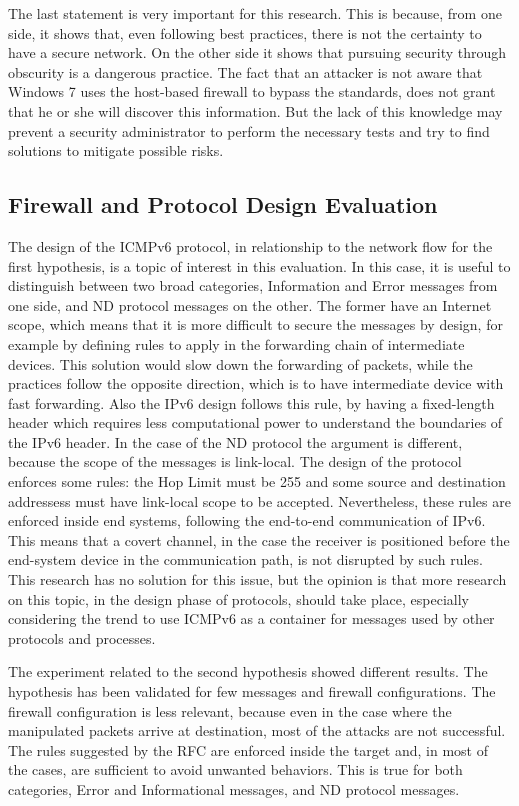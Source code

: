 \documentclass[12pt]{article}
\begin{document}
The last statement is very important for this research. This is because, from one side, it shows that, even following best practices, there is not the certainty to have a secure network. On the other side it shows that pursuing security through obscurity is a dangerous practice. The fact that an attacker is not aware that Windows 7 uses the host-based firewall to bypass the standards, does not grant that he or she will discover this information. But the lack of this knowledge may prevent a security administrator to perform the necessary tests and try to find solutions to mitigate possible risks.

\subsection{Firewall and Protocol Design Evaluation}
\label{sub:firewallEvaluation}

The design of the ICMPv6 protocol, in relationship to the network flow for the first hypothesis, is a topic of interest in this evaluation. In this case, it is useful to distinguish between two broad categories, Information and Error messages from one side, and ND protocol messages on the other. The former have an Internet scope, which means that it is more difficult to secure the messages by design, for example by defining rules to apply in the forwarding chain of intermediate devices. This solution would slow down the forwarding of packets, while the practices follow the opposite direction, which is to have intermediate device with fast forwarding. Also the IPv6 design follows this rule, by having a fixed-length header which requires less computational power to understand the boundaries of the IPv6 header. In the case of the ND protocol the argument is different, because the scope of the messages is link-local. The design of the protocol enforces some rules: the Hop Limit must be 255 and some source and destination addressess must have link-local scope to be accepted. Nevertheless, these rules are enforced inside end systems, following the end-to-end communication of IPv6. This means that a covert channel, in the case the receiver is positioned before the end-system device in the communication path, is not disrupted by such rules. This research has no solution for this issue, but the opinion is that more research on this topic, in the design phase of protocols, should take place, especially considering the trend to use ICMPv6 as a container for messages used by other protocols and processes.

The experiment related to the second hypothesis showed different results. The hypothesis has been validated for few messages and firewall configurations. The firewall configuration is less relevant, because even in the case where the manipulated packets arrive at destination, most of the attacks are not successful. The rules suggested by the RFC are enforced inside the target and, in most of the cases, are sufficient to avoid unwanted behaviors. This is true for both categories, Error and Informational messages, and ND protocol messages.
\end{document}
